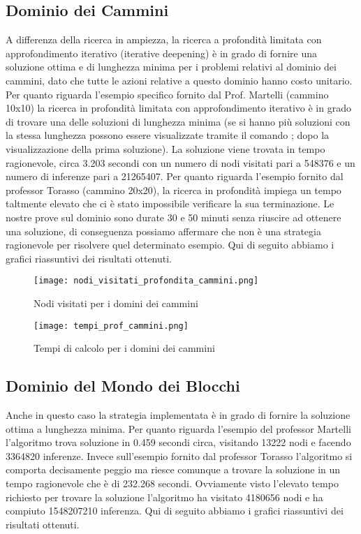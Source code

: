 \subsection{Dominio dei Cammini}
A differenza della ricerca in ampiezza, la ricerca a profondità limitata con approfondimento iterativo (iterative deepening) è in grado di fornire una soluzione ottima e di lunghezza minima per i problemi relativi al dominio dei cammini, dato che tutte le azioni relative a questo dominio hanno costo unitario. Per quanto riguarda l'esempio specifico fornito dal Prof. Martelli (cammino 10x10) la ricerca in profondità limitata con approfondimento iterativo è in grado di trovare una delle soluzioni di lunghezza minima (se si hanno più soluzioni con la stessa lunghezza possono essere visualizzate tramite il comando ; dopo la visualizzazione della prima soluzione). La soluzione viene trovata in tempo ragionevole, circa 3.203 secondi con un numero di nodi visitati pari a 548376 e un numero di inferenze pari a 21265407. Per quanto riguarda l'esempio fornito dal professor Torasso (cammino 20x20), la ricerca in profondità impiega un tempo taltmente elevato che ci è stato impossibile verificare la sua terminazione. Le nostre prove sul dominio sono durate 30 e 50 minuti senza riuscire ad ottenere una soluzione, di conseguenza possiamo affermare che non è una strategia ragionevole per risolvere quel determinato esempio.
Qui di seguito abbiamo i grafici riassuntivi dei risultati ottenuti.

\begin{figure}[htp]
  \texttt{[image: nodi\_visitati\_profondita\_cammini.png]}
  \caption{Nodi visitati per i domini dei cammini}
  \label{fig:figure5}
\end{figure}

\begin{figure}[htp]
  \texttt{[image: tempi\_prof\_cammini.png]}
  \caption{Tempi di calcolo per i domini dei cammini}
  \label{fig:figure6}
\end{figure}

\subsection{Dominio del Mondo dei Blocchi}
Anche in questo caso la strategia implementata è in grado di fornire la soluzione ottima a lunghezza minima. Per quanto riguarda l'esempio del professor Martelli l'algoritmo trova soluzione in 0.459 secondi circa, visitando 13222 nodi e facendo 3364820 inferenze. Invece sull'esempio fornito dal professor Torasso l'algoritmo si comporta decisamente peggio ma riesce comunque a trovare la soluzione in un tempo ragionevole che è di 232.268 secondi. Ovviamente visto l'elevato tempo richiesto per trovare la soluzione l'algoritmo ha visitato 4180656 nodi e ha compiuto 1548207210 inferenza.
Qui di seguito abbiamo i grafici riassuntivi dei risultati ottenuti.

